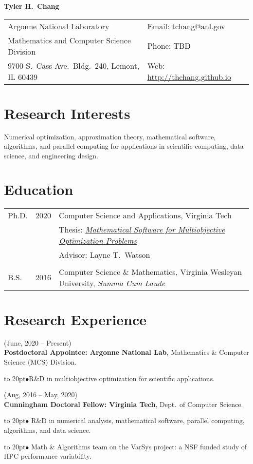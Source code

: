 \documentclass[11pt]{article}
\def\bullitem{\par\hangindent=15pt \hangafter=1
\noindent\hbox to 20pt{\hfil$\bullet$\hfil}\ignorespaces}
\begin{document}
{\Large \textbf{Tyler H.\ Chang}}

\begin{tabular}{ll}
   Argonne National Laboratory & Email: tchang@anl.gov\\
   Mathematics and Computer Science Division & Phone: TBD\\
   9700 S.\ Cass Ave.\ Bldg.\ 240, Lemont, IL 60439
      & Web: \url{http://thchang.github.io} \\
\end{tabular}

\section*{Research Interests}

Numerical optimization, approximation theory, mathematical software,
algorithms, and parallel computing for applications in scientific computing,
data science, and engineering design.

\section*{Education}

\begin{tabular}{lcl}
Ph.D. & 2020 & Computer Science and Applications, Virginia Tech\\
& & Thesis: 
\href{http://hdl.handle.net/10919/98915}
{\it Mathematical Software for Multiobjective Optimization Problems}\\
& & Advisor: Layne T.\ Watson\\
& \\
B.S. & 2016 & Computer Science \& Mathematics,
Virginia Wesleyan University, \textit{Summa Cum Laude}\\
\end{tabular}

\section*{Research Experience}

(June, 2020 -- Present)\\
\textbf{Postdoctoral Appointee: Argonne National Lab},
Mathematics \& Computer Science (MCS) Division.
\bullitem R\&D in multiobjective optimization for scientific applications.

\medskip

(Aug, 2016 -- May, 2020)\\
\textbf{Cunningham Doctoral Fellow: Virginia Tech}, Dept.\ of Computer Science.
\bullitem
R\&D in numerical analysis, mathematical software, parallel computing,
algorithms, and data science.
\bullitem
Math \& Algorithms team on the VarSys project: a NSF funded study of
HPC performance variability.
\end{document}
